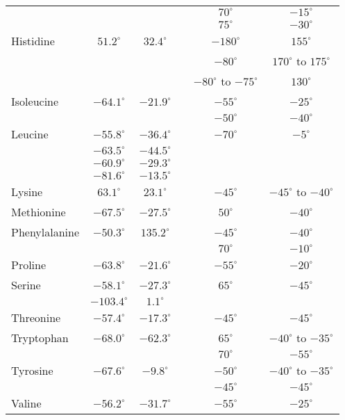 \documentclass[12pt]{article}
\begin{document}
\begin{center}
\begin{tabular}{lccccc}
                 &      &       & & $70^{\circ}$ & $-15^{\circ}$\\
                 &      &       & & $75^{\circ}$ & $-30^{\circ}$\\
Histidine        & $51.2^{\circ}$ & $32.4^{\circ}$ & & $-180^{\circ}$ & $155^{\circ}$  \\
		 &	 &	& & $-80^{\circ}$ & $170^{\circ}$ to $175^{\circ}$ \\
                 &       &      & & $-80^{\circ}$ to $-75^{\circ}$ & $130^{\circ}$ \\
Isoleucine      & $-64.1^{\circ}$ & $-21.9^{\circ}$ & & $-55^{\circ}$ & $-25^{\circ}$ \\
		&	&	& & $-50^{\circ}$ & $-40^{\circ}$ \\
Leucine         & $-55.8^{\circ}$ & $-36.4^{\circ}$ & & $-70^{\circ}$ & $-5^{\circ}$  \\
                & $-63.5^{\circ}$ & $-44.5^{\circ}$ & & & \\
                & $-60.9^{\circ}$ & $-29.3^{\circ}$ & & & \\
                & $-81.6^{\circ}$ & $-13.5^{\circ}$ & & & \\
Lysine          & $63.1^{\circ}$ & $23.1^{\circ}$ & & $-45^{\circ}$ & $-45^{\circ}$ to $-40^{\circ}$ \\
Methionine      & $-67.5^{\circ}$ & $-27.5^{\circ}$ & & $50^{\circ}$ & $-40^{\circ}$  \\
Phenylalanine   & $-50.3^{\circ}$ & $135.2^{\circ}$ & & $-45^{\circ}$ & $-40^{\circ}$  \\
                &       &       & & $70^{\circ}$ & $-10^{\circ}$ \\
Proline         &  $-63.8^{\circ}$ & $-21.6^{\circ}$ & & $-55^{\circ}$ & $-20^{\circ}$  \\
Serine          & $-58.1^{\circ}$ & $-27.3^{\circ}$ & & $65^{\circ}$ & $-45^{\circ}$ \\
		& $-103.4^{\circ}$ & $1.1^{\circ}$ & & & \\
Threonine       & $-57.4^{\circ}$ & $-17.3^{\circ}$ & & $-45^{\circ}$ & $-45^{\circ}$  \\
Tryptophan          & $-68.0^{\circ}$ & $-62.3^{\circ}$ & & $65^{\circ}$ & $-40^{\circ}$ to $-35^{\circ}$  \\
		&       &       & & $70^{\circ}$ & $-55^{\circ}$  \\
Tyrosine        & $-67.6^{\circ}$ & $-9.8^{\circ}$ & & $-50^{\circ}$ & $-40^{\circ}$ to $-35^{\circ}$ \\
                &       &       & & $-45^{\circ}$ & $-45^{\circ}$ \\
Valine          & $-56.2^{\circ}$ & $-31.7^{\circ}$ & & $-55^{\circ}$ & $-25^{\circ}$  \\
\hline
\end{tabular}
\end{center}
\end{document}
